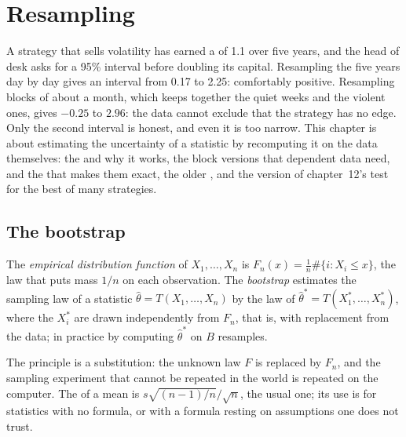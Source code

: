 \chapter{Resampling}\label{ch:qm:resampling}

A strategy that sells volatility has earned a  of 1.1 over five years, and the head of desk asks for a 95\% interval
before doubling its capital. Resampling the five years day by day gives an interval from 0.17 to 2.25: comfortably positive.
Resampling blocks of about a month, which keeps together the quiet weeks and the violent ones, gives $-0.25$ to $2.96$: the data
cannot exclude that the strategy has no edge. Only the second interval is honest, and even it is too narrow. This chapter is about
estimating the uncertainty of a statistic by recomputing it on the data themselves: the  and why it works, the block
versions that dependent data need,  and the  that makes them exact, the older , and the
 version of chapter~12's test for the best of many strategies.

\section{The bootstrap}

\begin{definition}\label{def:qm:resampling:bootstrap}
The \emph{empirical distribution function} of $X_1, \dots, X_n$ is $F_n(x) = \frac1n\#\{i: X_i
\le x\}$, the law that puts mass $1/n$ on each observation. The \emph{bootstrap} estimates the sampling law of a
statistic $\hat\theta = T(X_1, \dots, X_n)$ by the law of $\hat\theta^* = T(X_1^*, \dots, X_n^*)$, where the $X_i^*$ are drawn
independently from $F_n$, that is, with replacement from the data; in practice by computing $\hat\theta^*$ on $B$ resamples.
\end{definition}

The principle is a substitution: the unknown law $F$ is replaced by $F_n$, and the sampling experiment that cannot be repeated in
the world is repeated on the computer. The   of a mean is $s\sqrt{(n - 1)/n}/\sqrt n$, the usual one; its use
is for statistics with no formula, or with a formula resting on assumptions one does not trust.

